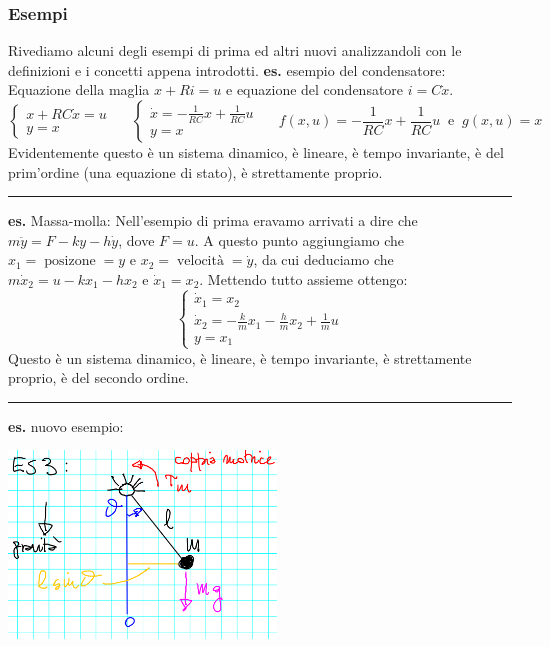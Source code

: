 \subsubsection{Esempi}
Rivediamo alcuni degli esempi di prima ed altri nuovi analizzandoli con le definizioni e i concetti appena introdotti.\newline
\newline
\textbf{es.} esempio del condensatore:\newline
Equazione della maglia $x + Ri = u$ e equazione del condensatore $i = C \dot{x}$.\newline
$$
\begin{cases}
    x + RC \dot{x} = u\\
    y=x
\end{cases} \;\;\;\;\;\begin{cases}
    \dot{x} = -\frac{1}{RC}x + \frac{1}{RC} u\\
    y = x
\end{cases} \;\;\;\;\; f(x,u) = -\frac{1}{RC}x + \frac{1}{RC} u \;\;\text{e}\;\; g(x,u) = x
$$
Evidentemente questo è un sistema dinamico, è lineare, è tempo invariante, è del prim'ordine (una equazione di stato), è strettamente proprio.\newline
\rule{\textwidth}{0,4pt}\newline
\newline
\textbf{es.} Massa-molla:\newline
Nell'esempio di prima eravamo arrivati a dire che $m \ddot{y} = F - ky - h \dot{y}$, dove $F = u$.\newline
A questo punto aggiungiamo che $x_1 = \; \text{posizone}\; = y$ e $x_2 = \; \text{velocità}\; = \dot{y}$, da cui deduciamo che $m \dot{x}_2 = u - k x_1 - h x_2$ e $\dot{x}_1 = x_2$. \newline
Mettendo tutto assieme ottengo:
\[
    \begin{cases}
        \dot{x}_1 = x_2\\
        \dot{x}_2 = -\frac{k}{m} x_1 - \frac{h}{m}x_2 + \frac{1}{m} u\\
        y = x_1
    \end{cases}
\]
Questo è un sistema dinamico, è lineare, è tempo invariante, è strettamente proprio, è del secondo ordine.\newline
\rule{\textwidth}{0,4pt}\newline
\newline
\textbf{es.} nuovo esempio:
\begin{center}
    \includegraphics[height=5cm]{../lezione2/img6.PNG}
\end{center}
